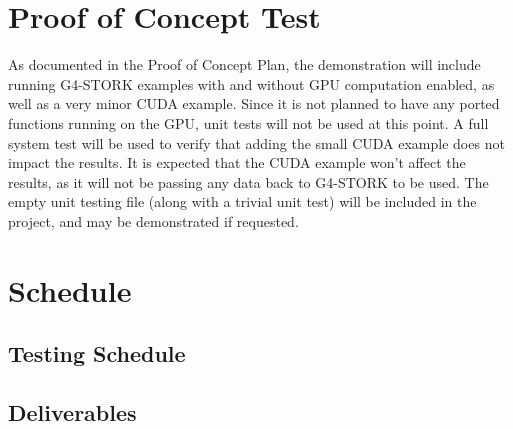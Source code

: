 \documentclass[12pt]{article}
\begin{document}
\section{Proof of Concept Test}
As documented in the Proof of Concept Plan, the demonstration will include running G4-STORK examples with and without GPU computation enabled, as well as a very minor CUDA example. Since it is not planned to have any ported functions running on the GPU, unit tests will not be used at this point. A full system test will be used to verify that adding the small CUDA example does not impact the results. It is expected that the CUDA example won't affect the results, as it will not be passing any data back to G4-STORK to be used. The empty unit testing file (along with a trivial unit test) will be included in the project, and may be demonstrated if requested.

\section{Schedule}

\subsection{Testing Schedule} %

\subsection{Deliverables} %
\end{document}

